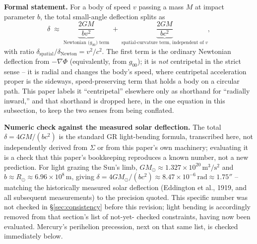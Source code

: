 \documentclass[12pt, a4paper]{article}
\begin{document}
\textbf{Formal statement.} For a body of speed $v$ passing a mass $M$
at impact parameter $b$, the total small-angle deflection splits as
\begin{equation}
\delta \;\approx\; \underbrace{\frac{2GM}{bv^2}}_{\text{Newtonian ($g_{00}$) term}} \;+\; \underbrace{\frac{2GM}{bc^2}}_{\text{spatial-curvature term, independent of }v},
\end{equation}
with ratio $\delta_{\text{spatial}}/\delta_{\text{Newton}}=v^2/c^2$.
The first term is the ordinary Newtonian deflection from $-\nabla\Phi$
(equivalently, from $g_{00}$); it is \emph{not} centripetal in the
strict sense -- it is radial and changes the body's speed, where
centripetal acceleration proper is the sideways, speed-preserving
term that holds a body on a circular path. This paper labels it
``centripetal'' elsewhere only as shorthand for ``radially inward,''
and that shorthand is dropped here, in the one equation in this
subsection, to keep the two senses from being conflated.

\textbf{Numeric check against the measured solar deflection.} The
total $\delta=4GM/(bc^2)$ is the standard GR light-bending formula,
transcribed here, not independently derived from $\Sigma$ or from
this paper's own machinery; evaluating it is a check that this
paper's bookkeeping reproduces a known number, not a new prediction.
For light grazing the Sun's limb, $GM_\odot\approx1.327\times10^{20}
\,\mathrm{m^3/s^2}$ and $b\approx R_\odot\approx6.96\times10^8\,
\mathrm{m}$, giving $\delta=4GM_\odot/(bc^2)\approx8.47\times10^{-6}
\,\mathrm{rad}\approx1.75''$ -- matching the historically measured
solar deflection (Eddington et al., 1919, and all subsequent
measurements) to the precision quoted. This specific number was not
checked in \S\ref{sec:consistency} before this revision; light
bending is accordingly removed from that section's list of not-yet-
checked constraints, having now been evaluated. Mercury's perihelion
precession, next on that same list, is checked immediately below.
\end{document}
